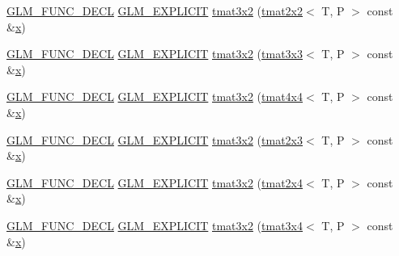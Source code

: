 \begin{DoxyCompactItemize}
\mbox{\hyperlink{setup_8hpp_ab2d052de21a70539923e9bcbf6e83a51}{G\+L\+M\+\_\+\+F\+U\+N\+C\+\_\+\+D\+E\+CL}} \mbox{\hyperlink{setup_8hpp_a6c74f5a5e7b134ab69023ff9a30d4d5d}{G\+L\+M\+\_\+\+E\+X\+P\+L\+I\+C\+IT}} \mbox{\hyperlink{structglm_1_1tmat3x2_a9af622af900c3ddb1a075d5083d700bd}{tmat3x2}} (\mbox{\hyperlink{structglm_1_1tmat2x2}{tmat2x2}}$<$ T, P $>$ const \&\mbox{\hyperlink{glad_8h_a92d0386e5c19fb81ea88c9f99644ab1d}{x}})
\item 
\mbox{\hyperlink{setup_8hpp_ab2d052de21a70539923e9bcbf6e83a51}{G\+L\+M\+\_\+\+F\+U\+N\+C\+\_\+\+D\+E\+CL}} \mbox{\hyperlink{setup_8hpp_a6c74f5a5e7b134ab69023ff9a30d4d5d}{G\+L\+M\+\_\+\+E\+X\+P\+L\+I\+C\+IT}} \mbox{\hyperlink{structglm_1_1tmat3x2_a3578a509c6af05bf0319417803261991}{tmat3x2}} (\mbox{\hyperlink{structglm_1_1tmat3x3}{tmat3x3}}$<$ T, P $>$ const \&\mbox{\hyperlink{glad_8h_a92d0386e5c19fb81ea88c9f99644ab1d}{x}})
\item 
\mbox{\hyperlink{setup_8hpp_ab2d052de21a70539923e9bcbf6e83a51}{G\+L\+M\+\_\+\+F\+U\+N\+C\+\_\+\+D\+E\+CL}} \mbox{\hyperlink{setup_8hpp_a6c74f5a5e7b134ab69023ff9a30d4d5d}{G\+L\+M\+\_\+\+E\+X\+P\+L\+I\+C\+IT}} \mbox{\hyperlink{structglm_1_1tmat3x2_ab66003b5f215e9eb712561b3b0ec39d2}{tmat3x2}} (\mbox{\hyperlink{structglm_1_1tmat4x4}{tmat4x4}}$<$ T, P $>$ const \&\mbox{\hyperlink{glad_8h_a92d0386e5c19fb81ea88c9f99644ab1d}{x}})
\item 
\mbox{\hyperlink{setup_8hpp_ab2d052de21a70539923e9bcbf6e83a51}{G\+L\+M\+\_\+\+F\+U\+N\+C\+\_\+\+D\+E\+CL}} \mbox{\hyperlink{setup_8hpp_a6c74f5a5e7b134ab69023ff9a30d4d5d}{G\+L\+M\+\_\+\+E\+X\+P\+L\+I\+C\+IT}} \mbox{\hyperlink{structglm_1_1tmat3x2_a1befb2e603dab6356eaf74504fa6bdfe}{tmat3x2}} (\mbox{\hyperlink{structglm_1_1tmat2x3}{tmat2x3}}$<$ T, P $>$ const \&\mbox{\hyperlink{glad_8h_a92d0386e5c19fb81ea88c9f99644ab1d}{x}})
\item 
\mbox{\hyperlink{setup_8hpp_ab2d052de21a70539923e9bcbf6e83a51}{G\+L\+M\+\_\+\+F\+U\+N\+C\+\_\+\+D\+E\+CL}} \mbox{\hyperlink{setup_8hpp_a6c74f5a5e7b134ab69023ff9a30d4d5d}{G\+L\+M\+\_\+\+E\+X\+P\+L\+I\+C\+IT}} \mbox{\hyperlink{structglm_1_1tmat3x2_abc4f2fcc9002757744b440948ad516ce}{tmat3x2}} (\mbox{\hyperlink{structglm_1_1tmat2x4}{tmat2x4}}$<$ T, P $>$ const \&\mbox{\hyperlink{glad_8h_a92d0386e5c19fb81ea88c9f99644ab1d}{x}})
\item 
\mbox{\hyperlink{setup_8hpp_ab2d052de21a70539923e9bcbf6e83a51}{G\+L\+M\+\_\+\+F\+U\+N\+C\+\_\+\+D\+E\+CL}} \mbox{\hyperlink{setup_8hpp_a6c74f5a5e7b134ab69023ff9a30d4d5d}{G\+L\+M\+\_\+\+E\+X\+P\+L\+I\+C\+IT}} \mbox{\hyperlink{structglm_1_1tmat3x2_af2e7c96eb468f302bc3b90dbc41e62d7}{tmat3x2}} (\mbox{\hyperlink{structglm_1_1tmat3x4}{tmat3x4}}$<$ T, P $>$ const \&\mbox{\hyperlink{glad_8h_a92d0386e5c19fb81ea88c9f99644ab1d}{x}})

\end{DoxyCompactItemize}
